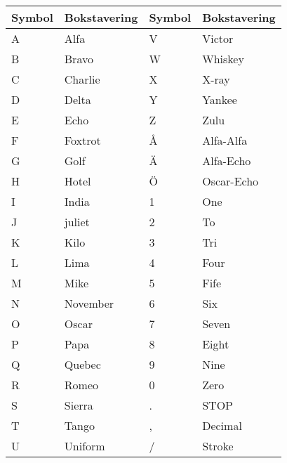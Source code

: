 \begin{longtable}{ll|ll}
	Symbol & Bokstavering & Symbol & Bokstavering \\ \hline
	\endhead
	A               & Alfa                  & V               & Victor                \\
	B               & Bravo                 & W               & Whiskey               \\
	C               & Charlie               & X               & X-ray                 \\
	D               & Delta                 & Y               & Yankee                \\
	E               & Echo                  & Z               & Zulu                  \\
	F               & Foxtrot               & Å               & Alfa-Alfa             \\
	G               & Golf                  & Ä               & Alfa-Echo             \\
	H               & Hotel                 & Ö               & Oscar-Echo            \\
	I               & India                 & 1               & One                   \\
	J               & juliet                & 2               & To                    \\
	K               & Kilo                  & 3               & Tri                   \\
	L               & Lima                  & 4               & Four                  \\
	M               & Mike                  & 5               & Fife                  \\
	N               & November              & 6               & Six                   \\
	O               & Oscar                 & 7               & Seven                 \\
	P               & Papa                  & 8               & Eight                 \\
	Q               & Quebec                & 9               & Nine                  \\
	R               & Romeo                 & 0               & Zero                  \\
	S               & Sierra                & .               & STOP                  \\
	T               & Tango                 & ,               & Decimal               \\
	U               & Uniform               & /               & Stroke
\end{longtable}

